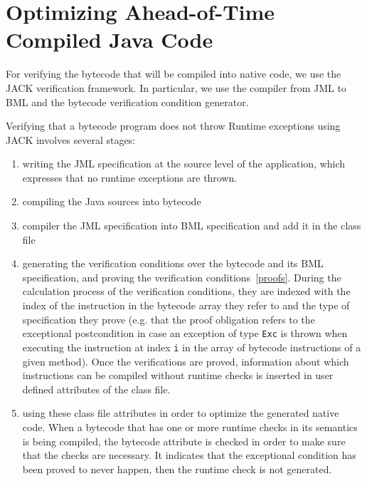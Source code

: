 \section{Optimizing Ahead-of-Time Compiled Java Code}
\label{sec:method}

For verifying the bytecode that will be compiled into native code, we use the JACK verification framework.
In particular, we use the compiler from JML to BML and the bytecode verification condition generator.



Verifying that a bytecode program does not throw Runtime exceptions using JACK involves several stages:
\begin{enumerate}
\item writing the JML specification at the source level of the application, which expresses that no runtime exceptions are thrown.
\item compiling the Java sources into bytecode 
\item compiler the JML specification into BML specification and add it in the class file
\item generating the verification conditions over the bytecode and its BML specification, and proving the verification conditions~\ref{proofs}. During the calculation process of the verification conditions, they are indexed with the index of the instruction in the bytecode array they refer to and the type of specification they prove (e.g. that the proof obligation refers to the exceptional postcondition in case an exception of type \texttt{Exc} is thrown when executing the instruction at index \texttt{i} in the array of bytecode instructions of a given method). Once the verifications are proved, information about which instructions can be compiled without runtime checks is inserted in user defined attributes of the class file.
\item using these class file attributes in order to optimize the generated native code. When a bytecode that has one or more runtime checks in its semantics is being compiled, the bytecode attribute is checked in order to make sure that the checks are necessary. It indicates that the exceptional condition has been proved to never happen, then the runtime check is not generated.
\end{enumerate}

